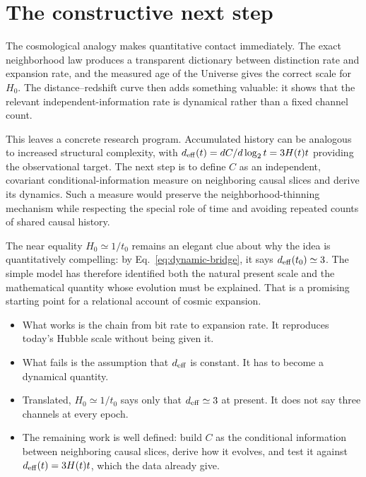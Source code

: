 \documentclass[10pt]{article}
\newenvironment{persuasions}
  {\begin{cpbox}\small\setlength{\parskip}{0pt}%
   {\footnotesize\bfseries\color{accent}%
    \textls[110]{CONCEPTUAL PERSUASIONS}}\par\vspace{3pt}%
   \begin{itemize}[leftmargin=1.15em,itemsep=2.5pt,topsep=0pt,parsep=0pt,
                   label=\textcolor{accent}{\scriptsize$\blacktriangleright$}]}
  {\end{itemize}\end{cpbox}}
\begin{document}
\section*{The constructive next step}

The cosmological analogy makes quantitative contact immediately.  The exact
neighborhood law produces a transparent dictionary between distinction rate
and expansion rate, and the measured age of the Universe gives the correct
scale for $H_0$.  The distance--redshift curve then adds something valuable:
it shows that the relevant independent-information rate is dynamical rather
than a fixed channel count.

This leaves a concrete research program.  Accumulated history can be analogous
to increased structural complexity, with
$d_{\rm eff}(t)=dC/d\log_2t=3H(t)t$ providing the observational target.  The
next step is to define $C$ as an independent, covariant conditional-information
measure on neighboring causal slices and derive its dynamics.  Such a measure
would preserve the neighborhood-thinning mechanism while respecting the
special role of time and avoiding repeated counts of shared causal history.

The near equality $H_0\simeq1/t_0$ remains an elegant clue about why the idea
is quantitatively compelling: by Eq.~\eqref{eq:dynamic-bridge}, it says
$d_{\rm eff}(t_0)\simeq3$.  The simple model has therefore identified both the
natural present scale and the mathematical quantity whose evolution must be
explained.  That is a promising starting point for a relational account of
cosmic expansion.

\begin{persuasions}
\item What works is the chain from bit rate to expansion rate.  It reproduces
today's Hubble scale without being given it.
\item What fails is the assumption that $d_{\rm eff}$ is constant.  It has to
become a dynamical quantity.
\item Translated, $H_0\simeq1/t_0$ says only that $d_{\rm eff}\simeq3$ at
present.  It does not say three channels at every epoch.
\item The remaining work is well defined: build $C$ as the conditional
information between neighboring causal slices, derive how it evolves, and test
it against $d_{\rm eff}(t)=3H(t)t$, which the data already give.
\end{persuasions}



\end{document}
